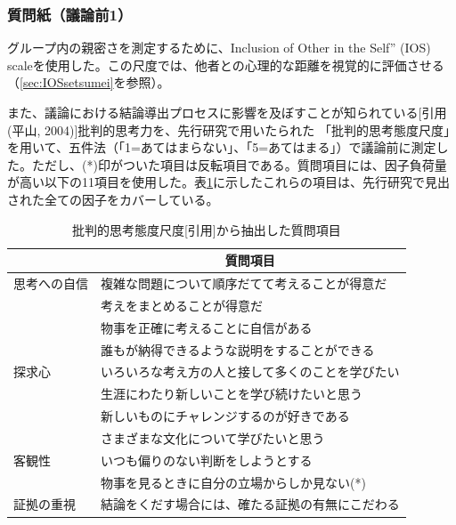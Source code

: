 \documentclass[11pt, a4paper]{jreport} %
\begin{document}
\subsubsection*{質問紙（議論前1）}
グループ内の親密さを測定するために、Inclusion of Other in the Self” (IOS) scaleを使用した。この尺度では、他者との心理的な距離を視覚的に評価させる（\ref{sec:IOSsetsumei}を参照）。



また、議論における結論導出プロセスに影響を及ぼすことが知られている[引用(平山, 2004)]批判的思考力を、先行研究で用いたられた
「批判的思考態度尺度」を用いて、五件法（「1=あてはまらない」、「5=あてはまる」）で議論前に測定した。ただし、(*)印がついた項目は反転項目である。質問項目には、因子負荷量が高い以下の11項目を使用した。表\ref{tab:hihanteki3}に示したこれらの項目は、先行研究で見出された全ての因子をカバーしている。
\begin{table}[H]
\caption{批判的思考態度尺度{[}引用{]}から抽出した質問項目}
\centering
\label{tab:hihanteki3}
\begin{tabular}{@{}ll@{}}
\toprule
\multicolumn{1}{c}{} & \multicolumn{1}{c}{質問項目} \\ \midrule
思考への自信               & 複雑な問題について順序だてて考えることが得意だ  \\
                     & 考えをまとめることが得意だ            \\
                     & 物事を正確に考えることに自信がある        \\
                     & 誰もが納得できるような説明をすることができる   \\
探求心                  & いろいろな考え方の人と接して多くのことを学びたい \\
                     & 生涯にわたり新しいことを学び続けたいと思う    \\
                     & 新しいものにチャレンジするのが好きである     \\
                     & さまざまな文化について学びたいと思う       \\
客観性                  & いつも偏りのない判断をしようとする        \\
                     & 物事を見るときに自分の立場からしか見ない(*)     \\
証拠の重視                & 結論をくだす場合には、確たる証拠の有無にこだわる \\ \bottomrule
\end{tabular}
\end{table}
\end{document}
